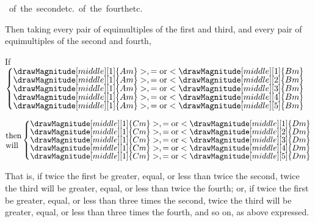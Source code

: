 \documentclass[booklanguage=english]{byrnebook}
\begin{document}
\sepSpace

\vbox{\hfill\hbox{
\vbox{\hbox{of the second}\hbox{}\hbox{etc.}}
\vbox{\hbox{of the fourth}\hbox{}\hbox{etc.}}
}\hfill\ }

\sepSpace

Then taking every pair of equimultiples of the first and third, and every pair of equimultiples of the second and fourth,

\begin{center}
If
$\left\{\vcenter{
\nointerlineskip\hbox{$\drawMagnitude[middle][1]{Am} >, = \mbox{or} < \drawMagnitude[middle][1]{Bm}$}
\nointerlineskip\hbox{$\drawMagnitude[middle][1]{Am} >, = \mbox{or} < \drawMagnitude[middle][2]{Bm}$}
\nointerlineskip\hbox{$\drawMagnitude[middle][1]{Am} >, = \mbox{or} < \drawMagnitude[middle][3]{Bm}$}
\nointerlineskip\hbox{$\drawMagnitude[middle][1]{Am} >, = \mbox{or} < \drawMagnitude[middle][4]{Bm}$}
\nointerlineskip\hbox{$\drawMagnitude[middle][1]{Am} >, = \mbox{or} < \drawMagnitude[middle][5]{Bm}$}
}\right.$

$\vcenter{\hbox{then}\hbox{will}}\left\{\vcenter{
\nointerlineskip\hbox{$\drawMagnitude[middle][1]{Cm} >, = \mbox{or} < \drawMagnitude[middle][1]{Dm}$}
\nointerlineskip\hbox{$\drawMagnitude[middle][1]{Cm} >, = \mbox{or} < \drawMagnitude[middle][2]{Dm}$}
\nointerlineskip\hbox{$\drawMagnitude[middle][1]{Cm} >, = \mbox{or} < \drawMagnitude[middle][3]{Dm}$}
\nointerlineskip\hbox{$\drawMagnitude[middle][1]{Cm} >, = \mbox{or} < \drawMagnitude[middle][4]{Dm}$}
\nointerlineskip\hbox{$\drawMagnitude[middle][1]{Cm} >, = \mbox{or} < \drawMagnitude[middle][5]{Dm}$}
}\right.$
\end{center}

That is, if twice the first be greater, equal, or less than twice the second, twice the third will be greater, equal, or less than twice the fourth; or, if twice the first be greater, equal, or less than three times the second, twice the third will be greater, equal, or less than three times the fourth, and so on, as above expressed.
\end{document}
